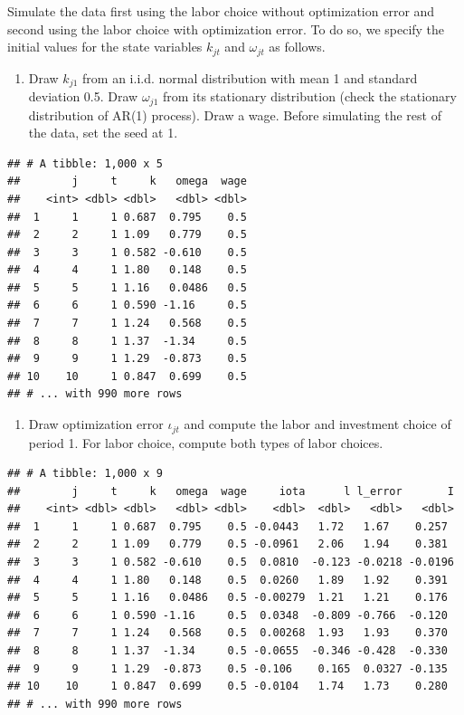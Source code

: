 \documentclass[]{book}
\providecommand{\tightlist}{%
  \setlength{\itemsep}{0pt}\setlength{\parskip}{0pt}}
\begin{document}
Simulate the data first using the labor choice without optimization
error and second using the labor choice with optimization error. To do
so, we specify the initial values for the state variables \(k_{jt}\) and
\(\omega_{jt}\) as follows.

\begin{enumerate}
\def\labelenumi{\arabic{enumi}.}
\setcounter{enumi}{5}
\tightlist
\item
  Draw \(k_{j1}\) from an i.i.d. normal distribution with mean 1 and
  standard deviation 0.5. Draw \(\omega_{j1}\) from its stationary
  distribution (check the stationary distribution of AR(1) process).
  Draw a wage. Before simulating the rest of the data, set the seed at
  1.
\end{enumerate}

\begin{verbatim}
## # A tibble: 1,000 x 5
##        j     t     k   omega  wage
##    <int> <dbl> <dbl>   <dbl> <dbl>
##  1     1     1 0.687  0.795    0.5
##  2     2     1 1.09   0.779    0.5
##  3     3     1 0.582 -0.610    0.5
##  4     4     1 1.80   0.148    0.5
##  5     5     1 1.16   0.0486   0.5
##  6     6     1 0.590 -1.16     0.5
##  7     7     1 1.24   0.568    0.5
##  8     8     1 1.37  -1.34     0.5
##  9     9     1 1.29  -0.873    0.5
## 10    10     1 0.847  0.699    0.5
## # ... with 990 more rows
\end{verbatim}

\begin{enumerate}
\def\labelenumi{\arabic{enumi}.}
\setcounter{enumi}{6}
\tightlist
\item
  Draw optimization error \(\iota_{jt}\) and compute the labor and
  investment choice of period 1. For labor choice, compute both types of
  labor choices.
\end{enumerate}

\begin{verbatim}
## # A tibble: 1,000 x 9
##        j     t     k   omega  wage     iota      l l_error       I
##    <int> <dbl> <dbl>   <dbl> <dbl>    <dbl>  <dbl>   <dbl>   <dbl>
##  1     1     1 0.687  0.795    0.5 -0.0443   1.72   1.67    0.257 
##  2     2     1 1.09   0.779    0.5 -0.0961   2.06   1.94    0.381 
##  3     3     1 0.582 -0.610    0.5  0.0810  -0.123 -0.0218 -0.0196
##  4     4     1 1.80   0.148    0.5  0.0260   1.89   1.92    0.391 
##  5     5     1 1.16   0.0486   0.5 -0.00279  1.21   1.21    0.176 
##  6     6     1 0.590 -1.16     0.5  0.0348  -0.809 -0.766  -0.120 
##  7     7     1 1.24   0.568    0.5  0.00268  1.93   1.93    0.370 
##  8     8     1 1.37  -1.34     0.5 -0.0655  -0.346 -0.428  -0.330 
##  9     9     1 1.29  -0.873    0.5 -0.106    0.165  0.0327 -0.135 
## 10    10     1 0.847  0.699    0.5 -0.0104   1.74   1.73    0.280 
## # ... with 990 more rows
\end{verbatim}
\end{document}
